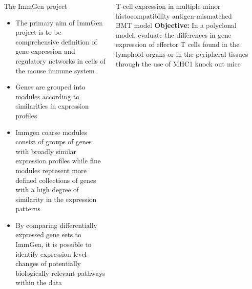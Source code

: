 \documentclass[final,hyperref={pdfpagelabels=false}]{beamer}
\begin{document}
\begin{frame}{}
\begin{columns}[t]
\begin{column}{.25\linewidth}
        \begin{block}{The ImmGen project}
          \begin{itemize}
          \item The primary aim of ImmGen project is to be comprehensive definition of gene expression and regulatory networks in cells of the mouse immune system
          \item Genes are grouped into modules according to similarities in expression profiles 
          \item Immgen coarse modules consist of groups of genes with broadly similar expression profiles while fine modules represent more defined collections of genes with a high degree of similarity in the expression patterns
	  \item By comparing differentially expressed gene sets to ImmGen, it is possible to identify expression level changes of potentially biologically relevant pathways within the data
          \end{itemize}
        \end{block}

      \end{column}


      \begin{column}{.24\linewidth}
        \begin{block}{T-cell expression in multiple minor histocompatibility antigen-mismatched BMT model}
	  {\bf Objective:} In a polyclonal model, evaluate the differences in gene expression of effector T cells found in the lymphoid organs or in the peripheral tissues through the use of MHC1 knock out mice


\end{block}
\end{column}
\end{columns}
\end{frame}
\end{document}
